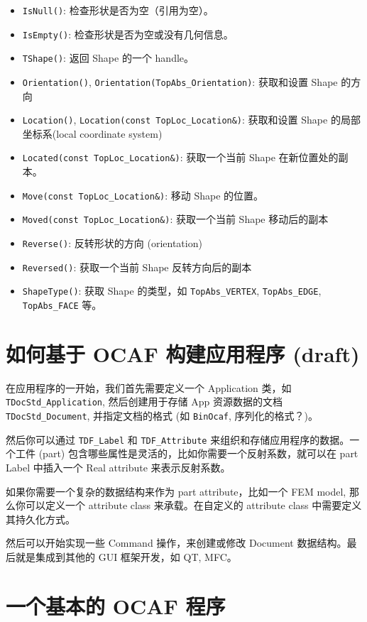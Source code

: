 \documentclass[11pt]{article}
\let\oldsection\section
\renewcommand{\section}{\clearpage\oldsection}
\begin{document}
\begin{itemize}
\item \texttt{IsNull()}: 检查形状是否为空（引用为空）。
\item \texttt{IsEmpty()}: 检查形状是否为空或没有几何信息。
\item \texttt{TShape()}: 返回 Shape 的一个 handle。
\item \texttt{Orientation()}, \texttt{Orientation(TopAbs\_Orientation)}: 获取和设置 Shape 的方向
\item \texttt{Location()}, \texttt{Location(const TopLoc\_Location\&)}: 获取和设置 Shape 的局部坐标系(local coordinate system)
\item \texttt{Located(const TopLoc\_Location\&)}: 获取一个当前 Shape 在新位置处的副本。
\item \texttt{Move(const TopLoc\_Location\&)}: 移动 Shape 的位置。
\item \texttt{Moved(const TopLoc\_Location\&)}: 获取一个当前 Shape 移动后的副本
\item \texttt{Reverse()}: 反转形状的方向 (orientation)
\item \texttt{Reversed()}: 获取一个当前 Shape 反转方向后的副本
\item \texttt{ShapeType()}: 获取 Shape 的类型，如 \texttt{TopAbs\_VERTEX}, \texttt{TopAbs\_EDGE}, \texttt{TopAbs\_FACE} 等。
\end{itemize}
\section{如何基于 OCAF 构建应用程序 (draft)}
\label{sec:org25b2fd5}

在应用程序的一开始，我们首先需要定义一个 Application 类，如 \texttt{TDocStd\_Application}, 然后创建用于存储 App 资源数据的文档 \texttt{TDocStd\_Document}, 并指定文档的格式 (如 \texttt{BinOcaf}, 序列化的格式？)。

然后你可以通过 \texttt{TDF\_Label} 和 \texttt{TDF\_Attribute} 来组织和存储应用程序的数据。一个工件 (part) 包含哪些属性是灵活的，比如你需要一个反射系数，就可以在 part Label 中插入一个 Real attribute 来表示反射系数。

如果你需要一个复杂的数据结构来作为 part attribute，比如一个 FEM model, 那么你可以定义一个 attribute class 来承载。在自定义的 attribute class 中需要定义其持久化方式。

然后可以开始实现一些 Command 操作，来创建或修改 Document 数据结构。最后就是集成到其他的 GUI 框架开发，如 QT, MFC。
\section{一个基本的 OCAF 程序}
\label{sec:org218aaec}
\end{document}

